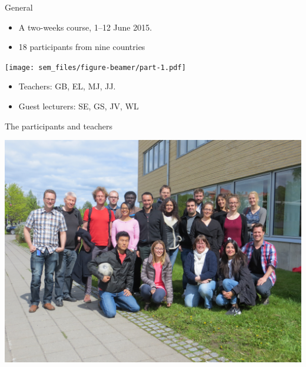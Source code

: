 \begin{frame}{General}

\begin{itemize}
\itemsep1pt\parskip0pt
\item
  A two-weeks course, 1--12 June 2015.
\item
  18 participants from nine countries
\end{itemize}

\texttt{[image: sem\_files/figure-beamer/part-1.pdf]}

\begin{itemize}
\itemsep1pt\parskip0pt
\item
  Teachers: GB, EL, MJ, JJ.
\item
  Guest lecturers: SE, GS, JV, WL
\end{itemize}

\end{frame}

\begin{frame}{The participants and teachers}

\includegraphics{figures/IMG_1780.JPG}

\end{frame}

